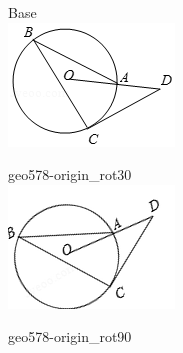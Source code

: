 \documentclass[12pt]{article}
\begin{document}
\begin{center}
\begin{minipage}{0.32\textwidth}\centering
Base\\
\includegraphics[width=0.95\linewidth]{out_rommath_origin/items/geo578-origin/assets/figure.png}
\end{minipage}
\hfill\begin{minipage}{0.32\textwidth}\centering
geo578-origin\_rot30\\
\includegraphics[width=0.95\linewidth]{out_rommath_origin/items/geo578-origin/assets/figure_rot30.png}
\end{minipage}
\hfill\begin{minipage}{0.32\textwidth}\centering
geo578-origin\_rot90\\

\end{minipage}
\end{center}
\end{document}
